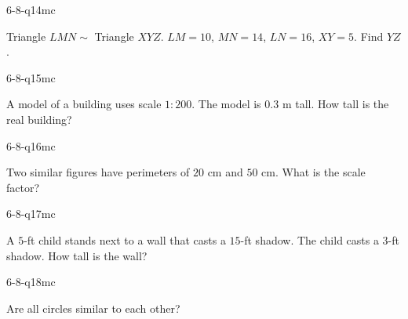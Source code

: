 \begin{practiceQuestion}{6-8-q14}{mc}
\begin{questionText}
Triangle $LMN \sim$ Triangle $XYZ$. $LM = 10$, $MN = 14$, $LN = 16$, $XY = 5$. Find $YZ$.
\end{questionText}
\end{practiceQuestion}

\begin{practiceQuestion}{6-8-q15}{mc}
\begin{questionText}
A model of a building uses scale $1:200$. The model is $0.3$ m tall. How tall is the real building?
\end{questionText}
\end{practiceQuestion}

\begin{practiceQuestion}{6-8-q16}{mc}
\begin{questionText}
Two similar figures have perimeters of $20$ cm and $50$ cm. What is the scale factor?
\end{questionText}
\end{practiceQuestion}

\begin{practiceQuestion}{6-8-q17}{mc}
\begin{questionText}
A $5$-ft child stands next to a wall that casts a $15$-ft shadow. The child casts a $3$-ft shadow. How tall is the wall?
\end{questionText}
\end{practiceQuestion}

\begin{practiceQuestion}{6-8-q18}{mc}
\begin{questionText}
Are all circles similar to each other?
\end{questionText}
\end{practiceQuestion}

